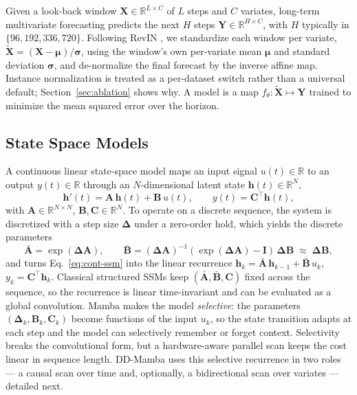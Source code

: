 \documentclass[review,12pt]{elsarticle}
\newcommand{\model}{DD-Mamba}
\begin{document}
Given a look-back window $\mathbf{X} \in \mathbb{R}^{L \times C}$ of $L$
steps and $C$ variates, long-term multivariate forecasting predicts the
next $H$ steps $\mathbf{Y} \in \mathbb{R}^{H \times C}$, with $H$ typically
in $\{96,192,336,720\}$. Following RevIN \cite{revin}, we standardize each
window per variate, $\tilde{\mathbf{X}} = (\mathbf{X} - \boldsymbol{\mu}) /
\boldsymbol{\sigma}$, using the window's own per-variate mean
$\boldsymbol{\mu}$ and standard deviation $\boldsymbol{\sigma}$, and
de-normalize the final forecast by the inverse affine map. Instance
normalization is treated as a per-dataset switch rather than a universal
default; Section~\ref{sec:ablation} shows why. A model is a map
$f_\theta:\tilde{\mathbf{X}}\mapsto\mathbf{Y}$ trained to minimize the mean
squared error over the horizon.

\subsection{State Space Models}
\label{sec:ssm-background}

A continuous linear state-space model maps an input signal $u(t)\in\mathbb{R}$
to an output $y(t)\in\mathbb{R}$ through an $N$-dimensional latent state
$\mathbf{h}(t)\in\mathbb{R}^{N}$,
\begin{equation}
\mathbf{h}'(t) = \mathbf{A}\,\mathbf{h}(t) + \mathbf{B}\,u(t), \qquad
y(t) = \mathbf{C}^{\top}\mathbf{h}(t),
\label{eq:cont-ssm}
\end{equation}
with $\mathbf{A}\in\mathbb{R}^{N\times N}$, $\mathbf{B},\mathbf{C}\in\mathbb{R}^{N}$.
To operate on a discrete sequence, the system is discretized with a step
size $\boldsymbol{\Delta}$ under a zero-order hold, which yields the
discrete parameters
\begin{equation}
\bar{\mathbf{A}} = \exp(\boldsymbol{\Delta}\mathbf{A}), \qquad
\bar{\mathbf{B}} = (\boldsymbol{\Delta}\mathbf{A})^{-1}
(\exp(\boldsymbol{\Delta}\mathbf{A}) - \mathbf{I})\,\boldsymbol{\Delta}\mathbf{B}
\;\approx\; \boldsymbol{\Delta}\mathbf{B},
\label{eq:zoh}
\end{equation}
and turns Eq.~\eqref{eq:cont-ssm} into the linear recurrence
$\mathbf{h}_k = \bar{\mathbf{A}}\,\mathbf{h}_{k-1} + \bar{\mathbf{B}}\,u_k$,
$y_k = \mathbf{C}^{\top}\mathbf{h}_k$. Classical structured SSMs keep
$(\bar{\mathbf{A}},\bar{\mathbf{B}},\mathbf{C})$ fixed across the sequence,
so the recurrence is linear time-invariant and can be evaluated as a global
convolution. Mamba \cite{mamba} makes the model \emph{selective}: the
parameters $(\boldsymbol{\Delta}_k,\mathbf{B}_k,\mathbf{C}_k)$ become
functions of the input $u_k$, so the state transition adapts at each step
and the model can selectively remember or forget context. Selectivity
breaks the convolutional form, but a hardware-aware parallel scan keeps the
cost linear in sequence length. \model{} uses this selective recurrence in
two roles --- a causal scan over time and, optionally, a bidirectional scan
over variates --- detailed next.
\end{document}
